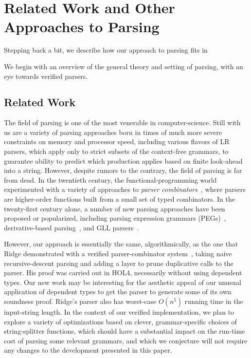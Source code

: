 \chapter{Related Work and Other Approaches to Parsing}

  Stepping back a bit, we describe how our approach to parsing fits in 

  We begin with an overview of the general theory and setting of parsing, with an eye towards verified parsers.  


\section{Related Work} \label{sec:related}
  The field of parsing is one of the most venerable in computer-science.  Still with us are a variety of parsing approaches born in times of much more severe constraints on memory and processor speed, including various flavors of LR parsers, which apply only to strict subsets of the context-free grammars, to guarantee ability to predict which production applies based on finite look-ahead into a string.  However, despite rumors to the contrary, the field of parsing is far from dead.  In the twentieth century, the functional-programming world experimented with a variety of approaches to \emph{parser combinators}~\cite{pcomb}, where parsers are higher-order functions built from a small set of typed combinators.  In the twenty-first century alone, a number of new parsing approaches have been proposed or popularized, including parsing expression grammars (PEGs)~\cite{PEG}, derivative-based parsing~\cite{Derivs}, and GLL parsers~\cite{GLL}.

  However, our approach is essentially the same, algorithmically, as the one that Ridge demonstrated with a verified parser-combinator system~\cite{Ridge}, taking naive recursive-descent parsing and adding a layer to prune duplicative calls to the parser.  His proof was carried out in HOL4, necessarily without using dependent types.  Our new work may be interesting for the aesthetic appeal of our unusual application of dependent types to get the parser to generate some of its own soundness proof.  Ridge's parser also has worst-case $O(n^5)$ running time in the input-string length.  In the context of our verified implementation, we plan to explore a variety of optimizations based on clever, grammar-specific choices of string-splitter functions, which should have a substantial impact on the run-time cost of parsing some relevant grammars, and which we conjecture will not require any changes to the development presented in this paper.

